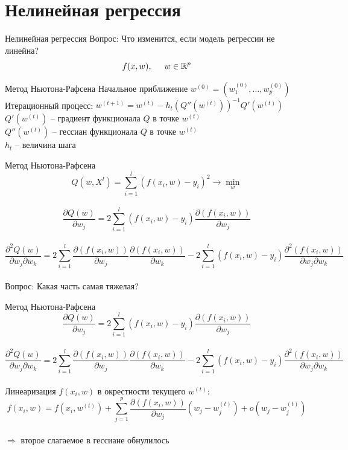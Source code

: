 \documentclass[10pt]{beamer}
\begin{document}
\section{Нелинейная регрессия}

\begin{frame}{Нелинейная регрессия}
	\alert{Вопрос:} Что изменится, если модель регрессии не линейна?\\
	\bigbreak
	$$f(x, w), \hspace{5mm} w \in \mathbb{R}^p$$
\end{frame}

\begin{frame}{Метод Ньютона-Рафсена}
	Начальное приближение $w^{(0)} = (w_1^{(0)}, \dots, w_p^{(0)})$\\
	Итерационный процесс: $w^{(t+1)} = w^{(t)} - h_t (Q''(w^{(t)}))^{-1}Q'(w^{(t)})$\\
	\bigbreak
	$Q'(w^{(t)})$ -- градиент функционала $Q$ в точке $w^{(t)}$\\
	$Q''(w^{(t)})$ -- гессиан функционала $Q$ в точке $w^{(t)}$\\
	$h_t$ -- величина шага
\end{frame}

\begin{frame}{Метод Ньютона-Рафсена}
	$$Q(w,X^l) = \sum\limits_{i=1}^l (f (x_i, w) - y_i)^2 \rightarrow \min\limits_{w}$$\\
	\pause
	$$\frac{\partial Q(w)}{\partial w_j} = 2 \sum\limits_{i=1}^l (f(x_i, w) - y_i ) \frac{\partial(f(x_i, w))}{\partial w_j}$$\\
	\pause
	$$\frac{\partial^2 Q(w)}{\partial w_j \partial w_k} = 2 \sum\limits_{i=1}^l \frac{\partial(f(x_i, w))}{\partial w_j} \frac{\partial(f(x_i, w))}{\partial w_k} - 2 \sum\limits_{i=1}^l (f(x_i, w) - y_i ) \frac{\partial^2 (f(x_i, w))}{\partial w_j \partial w_k}$$\\
	\bigbreak
	\pause
	\alert{Вопрос:} Какая часть самая тяжелая?
\end{frame}

\begin{frame}{Метод Ньютона-Рафсена}
	$$\frac{\partial Q(w)}{\partial w_j} = 2 \sum\limits_{i=1}^l (f(x_i, w) - y_i ) \frac{\partial(f(x_i, w))}{\partial w_j}$$\\
	\pause
	$$\frac{\partial^2 Q(w)}{\partial w_j \partial w_k} = 2 \sum\limits_{i=1}^l \frac{\partial(f(x_i, w))}{\partial w_j} \frac{\partial(f(x_i, w))}{\partial w_k} - 2 \sum\limits_{i=1}^l (f(x_i, w) - y_i ) \frac{\partial^2 (f(x_i, w))}{\partial w_j \partial w_k}$$\\
	\bigbreak
	\pause
	Линеаризация $f(x_i, w)$ в окрестности текущего $w^{(t)}$:\\
	$$f(x_i, w) = f(x_i, w^{(t)}) + \sum\limits_{j=1}^p \frac{\partial(f(x_i, w))}{\partial w_j} (w_j - w_j^{(t)}) + o(w_j -w_j^{(t)})$$\\
	$\Rightarrow$ второе слагаемое в гессиане обнулилось
\end{frame}
\end{document}
